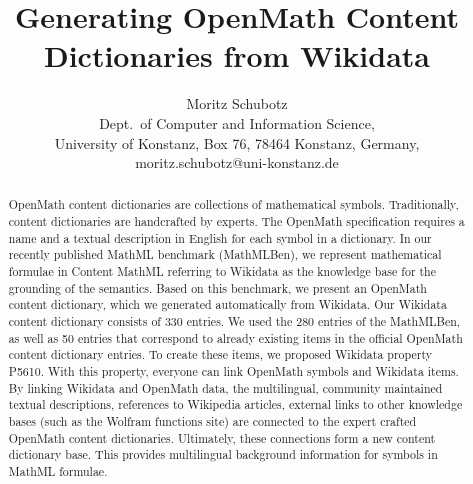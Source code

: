 \documentclass[a4paper]{article}
\title{Generating OpenMath Content Dictionaries from Wikidata}
\author{Moritz Schubotz \\
 Dept.~of Computer and Information Science,\\
 University of Konstanz, Box 76, 78464 Konstanz, Germany,\\
 moritz.schubotz@uni-konstanz.de
}
\begin{document}
\maketitle

\begin{abstract}
OpenMath content dictionaries are collections of mathematical symbols.
Traditionally, content dictionaries are handcrafted by experts.
The OpenMath specification requires a name and a textual description in English for each symbol in a dictionary.
In our recently published MathML benchmark (MathMLBen), we represent mathematical formulae in Content MathML referring to Wikidata as the knowledge base for the grounding of the semantics.
Based on this benchmark, we present an OpenMath content dictionary, which we generated automatically from Wikidata.
Our Wikidata content dictionary consists of 330 entries.
We used the 280 entries of the MathMLBen, as well as 50 entries that correspond to already existing items in the official OpenMath content dictionary entries.
To create these items, we proposed Wikidata property P5610.
With this property, everyone can link OpenMath symbols and Wikidata items.
By linking Wikidata and OpenMath data, the multilingual, community maintained textual descriptions, references to Wikipedia articles, external links to other knowledge bases (such as the Wolfram functions site) are connected to the expert crafted OpenMath content dictionaries.
Ultimately, these connections form a new content dictionary base.
This provides multilingual background information for symbols in MathML formulae.
\end{abstract}
\end{document}
